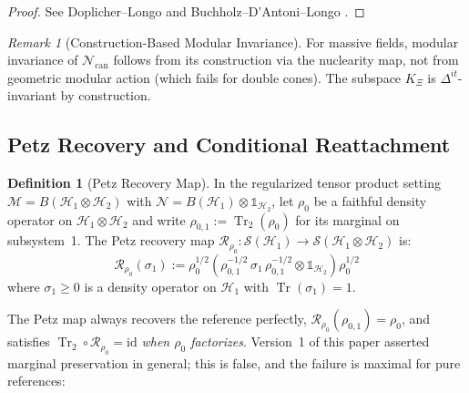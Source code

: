 \documentclass[11pt,a4paper]{article}
\newcommand{\idm}{\mathds{1}}}{\newcommand{\idm}{\mathbf{1}}}
\theoremstyle{plain}
\theoremstyle{definition}
\newtheorem{definition}[theorem]{Definition}
\theoremstyle{remark}
\newtheorem{remark}[theorem]{Remark}
\newcommand{\Nn}{\mathcal{N}}
\newcommand{\Mm}{\mathcal{M}}
\newcommand{\Hh}{\mathcal{H}}
\newcommand{\Tr}{\operatorname{Tr}}
\newcommand{\Ncan}{\Nn_{\mathrm{can}}}
\begin{document}
\begin{proof}
See Doplicher--Longo \cite[Theorem~4.1]{DoplicherLongo84} and
Buchholz--D'Antoni--Longo \cite[Proposition~3.2]{BDL90}.
\end{proof}

\begin{remark}[Construction-Based Modular Invariance]
For massive fields, modular invariance of $\Ncan$ follows from its construction via
the nuclearity map, not from geometric modular action (which fails for double
cones). The subspace $K_\Xi$ is $\Delta^{it}$-invariant by construction.
\end{remark}

\subsection{Petz Recovery and Conditional Reattachment}\label{sec:petzreattach}

\begin{definition}[Petz Recovery Map]\label{def:petz}
In the regularized tensor product setting $\Mm = B(\Hh_1 \otimes \Hh_2)$ with
$\Nn = B(\Hh_1) \otimes \idm_{\Hh_2}$, let $\rho_0$ be a faithful density
operator on $\Hh_1 \otimes \Hh_2$ and write $\rho_{0,1} := \Tr_2(\rho_0)$ for its
marginal on subsystem~1. The Petz recovery map
$\mathcal{R}_{\rho_0}: \mathcal{S}(\Hh_1) \to \mathcal{S}(\Hh_1 \otimes \Hh_2)$ is:
\begin{equation}\label{eq:petzdef}
\mathcal{R}_{\rho_0}(\sigma_1) := \rho_0^{1/2}\left(\rho_{0,1}^{-1/2}\,\sigma_1\,
\rho_{0,1}^{-1/2} \otimes \idm_{\Hh_2}\right)\rho_0^{1/2}
\end{equation}
where $\sigma_1 \ge 0$ is a density operator on $\Hh_1$ with $\Tr(\sigma_1) = 1$.
\end{definition}

The Petz map always recovers the reference perfectly,
$\mathcal{R}_{\rho_0}(\rho_{0,1}) = \rho_0$, and satisfies $\Tr_2 \circ
\mathcal{R}_{\rho_0} = \mathrm{id}$ \emph{when $\rho_0$ factorizes}. Version~1 of
this paper asserted marginal preservation in general; this is false, and the
failure is maximal for pure references:
\end{document}
